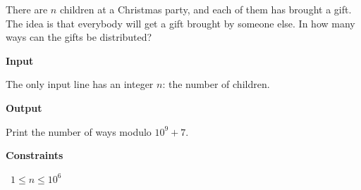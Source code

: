 There are $n$ children at a Christmas party, and each of them has brought a gift. The idea is that everybody will get a gift brought by someone else.
In how many ways can the gifts be distributed?

\vspace{0.3cm}\noindent\textbf{Input}

The only input line has an integer $n$: the number of children.

\vspace{0.3cm}\noindent\textbf{Output}

Print the number of ways modulo $10^9+7$.

\vspace{0.3cm}\noindent\textbf{Constraints}

\textbullet\ $1 \le n \le 10^6$